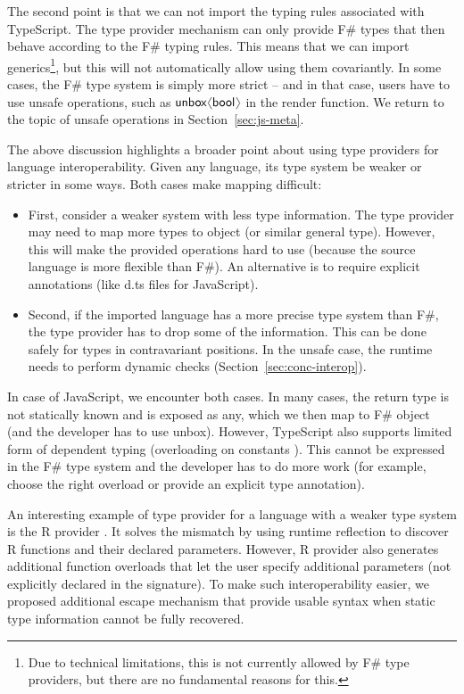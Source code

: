 \documentclass[submission,copyright,creativecommons]{eptcs}
\newcommand{\langl}{\begin{picture}(4.5,7)
\put(1.1,2.5){\rotatebox{60}{\line(1,0){5.5}}}
\put(1.1,2.5){\rotatebox{300}{\line(1,0){5.5}}}
\end{picture}}
\newcommand{\rangl}{\begin{picture}(4.5,7)
\put(.9,2.5){\rotatebox{120}{\line(1,0){5.5}}}
\put(.9,2.5){\rotatebox{240}{\line(1,0){5.5}}}
\end{picture}}
\newcommand{\kvd}[1]{\textnormal{\textcolor{kvdclr}{\sffamily #1}}}
\newcommand{\ident}[1]{\textnormal{\sffamily #1}}
\begin{document}
The second point is that we can not import the typing rules associated with TypeScript.
The type provider mechanism can only provide F\# types that then behave according to the
F\# typing rules. This means that we can import generics\footnote{Due to technical 
limitations, this is not currently allowed by F\# type providers, but there are no
fundamental reasons for this.}, but this will not automatically allow using them 
covariantly. In some cases, the F\# type system is simply more strict -- and in that case,
users have to use unsafe operations, such as $\ident{unbox}\langl \ident{bool} \rangl$ 
in the \ident{render} function. We return to the topic of unsafe operations in 
Section~\ref{sec:js-meta}.

The above discussion highlights a broader point about using type providers for language
interoperability. Given any language, its type system be weaker or stricter in some ways.
Both cases make mapping difficult:

\begin{itemize}
\item First, consider a weaker system with less type information. The type provider may need
  to map more types to \ident{object} (or similar general type). However, this will make 
  the provided operations hard to use (because the source language is more flexible than
  F\#). An alternative is to require explicit annotations (like \textcolor{strclr}{\ttfamily d.ts} 
  files for JavaScript).

\item Second, if the imported language has a more precise type system than F\#, the type 
  provider has to drop some of the information. This can be done safely for types in 
  contravariant positions. In the unsafe case, the runtime needs to perform dynamic checks 
  (Section~\ref{sec:conc-interop}).
\end{itemize}

\noindent
In case of JavaScript, we encounter both cases. In many cases, the return type is not
statically known and is exposed as \kvd{any}, which we then map to F\# \ident{object}
(and the developer has to use \ident{unbox}). However, TypeScript also supports limited
form of dependent typing (overloading on constants \cite{ms-typescript-09}). This cannot
be expressed in the F\# type system and the developer has to do more work (for example,
choose the right overload or provide an explicit type annotation).

An interesting example of type provider for a language with a weaker type system is the
R provider \cite{fsharp-rprovider}. It solves the mismatch by using runtime reflection 
to discover R functions and their declared parameters. However, R provider also generates
additional function overloads that let the user specify additional parameters (not explicitly 
declared in the signature). To make such interoperability easier, we proposed additional 
escape mechanism \cite{fsharp-paramsdict} that provide usable syntax when static type information 
cannot be fully recovered.
\end{document}
